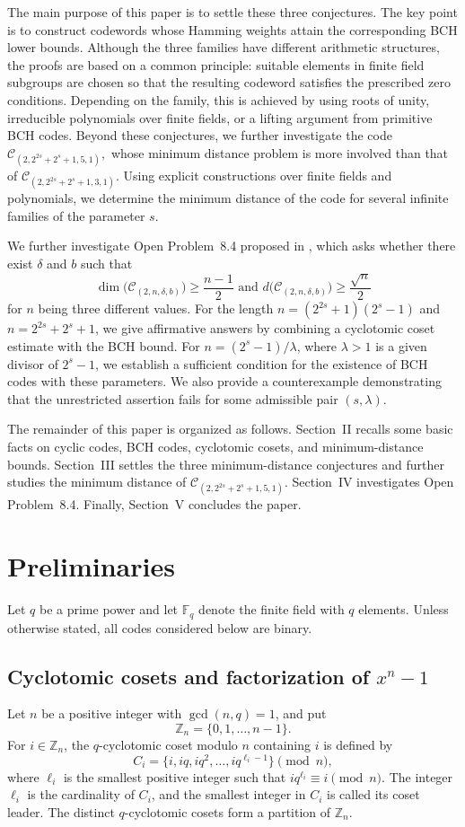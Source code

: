 \documentclass[12pt,draftcls,journal,onecolumn]{IEEEtran}
\begin{document}
The main purpose of this paper is to settle these three conjectures. The key point is to construct
codewords whose Hamming weights attain the corresponding BCH lower bounds. Although the three
families have different arithmetic structures, the proofs are based on a common principle: suitable
elements in finite field subgroups are chosen so that the resulting codeword satisfies the prescribed
zero conditions. Depending on the family, this is achieved by using roots of unity, irreducible
polynomials over finite fields, or a lifting argument from primitive BCH codes.
Beyond these conjectures, we further investigate the code $\mathcal{C}_{(2,2^{2s}+2^s+1,5,1)},$ whose minimum distance problem is more involved than that of $\mathcal{C}_{(2,2^{2s}+2^s+1,3,1)}$. Using explicit constructions over finite fields and polynomials, we determine the minimum distance of the code for several infinite families of the parameter $s$.


We further investigate Open Problem~8.4 proposed in \cite{Chen59}, which asks whether there exist
$\delta$ and $b$ such that
\[
\dim\bigl(\mathcal{C}_{(2,n,\delta,b)}\bigr)\geq \frac{n-1}{2}
\,\,
\text{and}\,\,
d\bigl(\mathcal{C}_{(2,n,\delta,b)}\bigr)\geq \frac{\sqrt n}{2}
\] for $n$ being three different values.
For the length $n=(2^{2s}+1)(2^s-1)$ and $n=2^{2s}+2^s+1$, we give affirmative answers by combining a cyclotomic coset
estimate with the BCH bound. For $n=(2^s-1)/\lambda$, where $\lambda>1$ is a given divisor of $2^s-1$, we establish a sufficient condition for the existence of BCH codes with these parameters. We also provide a counterexample demonstrating that the unrestricted assertion fails for some admissible pair $(s,\lambda)$.

The remainder of this paper is organized as follows. Section~II recalls some basic facts on cyclic
codes, BCH codes, cyclotomic cosets, and minimum-distance bounds. Section~III settles the three
minimum-distance conjectures and further studies the minimum distance of
$\mathcal{C}_{(2,2^{2s}+2^s+1,5,1)}$. Section~IV investigates Open Problem~8.4. Finally,
Section~V concludes the paper.



\section{Preliminaries}
Let $q$ be a prime power and let $\mathbb{F}_q$ denote the finite field with $q$ elements. Unless otherwise stated, all codes considered below are
binary.
\subsection{ Cyclotomic cosets and factorization of \(x^n-1\)}
Let $n$ be a positive integer with $\gcd(n,q)=1$, and put
\[
\mathbb{Z}_n=\{0,1,\ldots,n-1\}.
\]
For $i\in\mathbb{Z}_n$, the $q$-cyclotomic coset modulo $n$
containing $i$ is defined by
\[
C_i=\{i,iq,iq^2,\ldots,iq^{\ell_i-1}\}\pmod n,
\]
where $\ell_i$ is the smallest positive integer such that
$
iq^{\ell_i}\equiv i\pmod n.
$
The integer $\ell_i$ is the cardinality of $C_i$, and the smallest
integer in $C_i$ is called its coset leader. The distinct
$q$-cyclotomic cosets form a partition of $\mathbb{Z}_n$.
\end{document}
